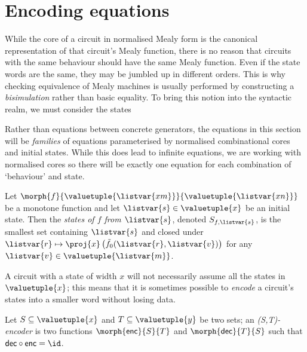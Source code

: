 \section{Encoding equations}

While the core of a circuit in normalised Mealy form is the canonical
representation of that circuit's Mealy function, there is no reason that
circuits with the same behaviour should have the same Mealy function.
Even if the state words are the same, they may be jumbled up in different
orders.
This is why checking equivalence of Mealy machines is usually performed by
constructing a \emph{bisimulation} rather than basic equality.
To bring this notion into the syntactic realm, we must consider the states

\begin{remark}
    Rather than equations between concrete generators, the equations in this
    section will be \emph{families} of equations parameterised by normalised
    combinational cores and initial states.
    While this does lead to infinite equations, we are working with normalised
    cores so there will be exactly one equation for each combination of
    `behaviour' and state.
\end{remark}

\begin{definition}[States]
    Let \(\morph{f}{\valuetuple{\listvar{xm}}}{\valuetuple{\listvar{xn}}}\) be a
    monotone function and let \(\listvar{s} \in  \valuetuple{x}\) be an
    initial state.
    Then the \emph{states of \(f\) from \(\listvar{s}\)}, denoted
    \(S_{f,\listvar{s}}\), is the smallest set containing \(\listvar{s}\) and
    closed under \(
    \listvar{r}
    \mapsto
    \proj{x}\left(\tilde{f}_0(\listvar{r},\listvar{v})\right)
    \) for any \(\listvar{v} \in \valuetuple{\listvar{m}}\).
\end{definition}

A circuit with a state of width \(x\) will not necessarily assume all the states
in \(\valuetuple{x}\); this means that it is sometimes possible to \emph{encode}
a circuit's states into a smaller word without losing data.

\begin{definition}[Encoder]\label{def:encoder}
    Let \(S \subseteq \valuetuple{x}\) and \(T \subseteq \valuetuple{y}\) be two
    sets; an \emph{(S,T)-encoder} is two functions \(
    \morph{\mathsf{enc}}{S}{T}
    \) and \(
    \morph{\mathsf{dec}}{T}{S}
    \) such that \(\mathsf{dec} \circ \mathsf{enc} = \id\).
\end{definition}

